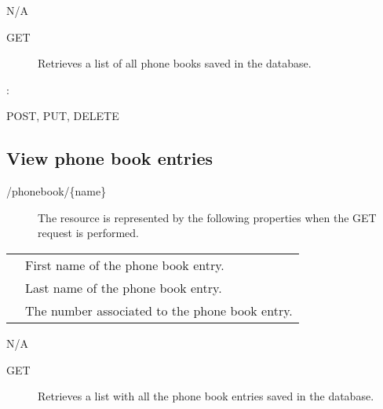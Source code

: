 \documentclass[letterpaper,10pt,english]{sphinxmanual}
\begin{document}
 N/A
\begin{description}
\item[{ GET}] \leavevmode
Retrieves a list of all phone books saved in the database.

\end{description}

:

\begin{sphinxVerbatim}[commandchars=\\\{\}]
\end{sphinxVerbatim}

 POST, PUT, DELETE


\subsection{View phone book entries}
\label{\detokenize{restapi:view-phone-book-entries}}
 /phonebook/\{name\}
\begin{description}
\item[{}] \leavevmode
The resource is represented by the following properties when the GET request is performed.

\end{description}


\begin{savenotes}\sphinxattablestart
\centering
\begin{tabulary}{\linewidth}[t]{|T|T|}
\hline

&
\\
\hline
{}
&
First name of the phone book entry.
\\
\hline
{}
&
Last name of the phone book entry.
\\
\hline
{}
&
The number associated to the phone book entry.
\\
\hline
\end{tabulary}
\par
\sphinxattableend\end{savenotes}

 N/A
\begin{description}
\item[{ GET}] \leavevmode
Retrieves a list with all the phone book entries saved in the database.

\end{description}
\end{document}
